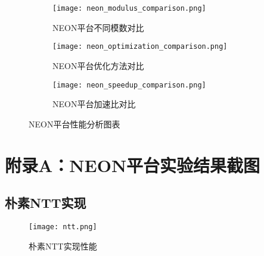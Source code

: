 \documentclass[a4paper,colorlinks=true,linkcolor=blue,urlcolor=blue,citecolor=green,bookmarks=true]{article}
\begin{document}
\begin{figure}[H]
  \centering
  \begin{subfigure}[b]{0.32\textwidth}
    \centering
    \texttt{[image: neon\_modulus\_comparison.png]}
    \caption{NEON平台不同模数对比}
    \label{fig:neon_modulus}
  \end{subfigure}
  \hfill
  \begin{subfigure}[b]{0.32\textwidth}
    \centering
    \texttt{[image: neon\_optimization\_comparison.png]}
    \caption{NEON平台优化方法对比}
    \label{fig:neon_optimization}
  \end{subfigure}
  \hfill
  \begin{subfigure}[b]{0.32\textwidth}
    \centering
    \texttt{[image: neon\_speedup\_comparison.png]}
    \caption{NEON平台加速比对比}
    \label{fig:neon_speedup}
  \end{subfigure}
  \caption{NEON平台性能分析图表}
  \label{fig:neon_performance}
\end{figure}

\clearpage
{}
{}
\renewcommand{\bibname}{参考文献}
\nocite{*} %


\clearpage
{}
\appendix
{}
\section*{附录A：NEON平台实验结果截图}
\renewcommand{\thesubsection}{A.\arabic{subsection}}

\setcounter{figure}{0}
\renewcommand{\thefigure}{A.\arabic{figure}}

\subsection{朴素NTT实现}
\begin{figure}[H]
  \centering
  \texttt{[image: ntt.png]}
  \caption{朴素NTT实现性能}
  \label{fig:ntt_screenshot}
\end{figure}
\end{document}
